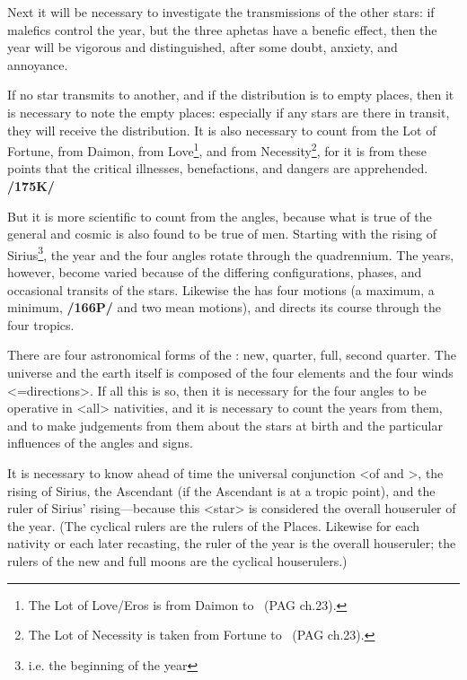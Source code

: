 Next it will be necessary to investigate the transmissions of the other stars: if malefics control the year, but the three aphetas have a benefic effect, then the year will be vigorous and distinguished, after some doubt, anxiety, and annoyance.

If no star transmits to another, and if the distribution is to empty places, then it is necessary to note the empty places: especially if any stars are there in transit, they will receive the distribution. It is also necessary to count from the Lot of Fortune, from Daimon, from Love\footnote{The Lot of Love/Eros is from Daimon to \Venus\, (PAG ch.23).}, and from Necessity\footnote{The Lot of Necessity is taken from Fortune to \Mercury\, (PAG ch.23).}, for it is from these points that the critical illnesses, benefactions, and dangers are apprehended. \textbf{/175K/}

But it is more scientific to count from the angles, because what is true of the general and cosmic is also found to be true of men. Starting with the rising of Sirius\footnote{i.e. the beginning of the year}, the year and the four angles rotate through the quadrennium. The years, however, become varied because of the differing configurations, phases, and occasional transits of the stars. Likewise the \Sun\xspace has four motions (a maximum, a minimum, \textbf{/166P/} and two mean motions), and directs its course through the four tropics. 

There are four astronomical forms of the \Moon: new, quarter, full, second quarter. The universe and the earth itself is composed of the four elements and the four winds <=directions>. If all this is so, then it is necessary for the four angles to be operative in <all> nativities, and it is necessary to count the years from them, and to make judgements from them about the stars at birth and the particular influences of the angles and signs. 

It is necessary to know ahead of time the universal conjunction <of \Sun\xspace and \Moon>, the rising of Sirius, the Ascendant (if the Ascendant is at a tropic point), and the ruler of Sirius’ rising—because this <star> is considered the overall houseruler of the year. (The cyclical rulers are the rulers of the Places. Likewise for each nativity or each later recasting, the ruler of the year is the overall houseruler; the rulers of the new and full moons are
the cyclical houserulers.)

